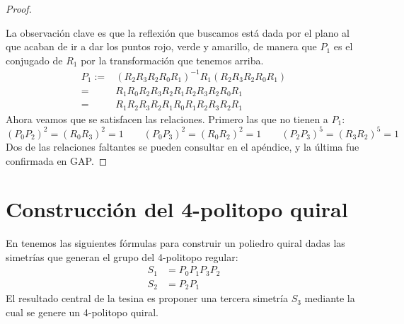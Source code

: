 \documentclass[spanish]{article}
\theoremstyle{definition}
\begin{document}
\begin{proof}
\begin{figure}[H]
\begin{subfigure}{0.4\linewidth}
		\end{subfigure}
	\end{figure}
	La observación clave es que la reflexión que buscamos está dada por el plano al que acaban de ir a dar los puntos rojo, verde y amarillo, de manera que $P_1$ es el conjugado de $R_1$ por la transformación que tenemos arriba.
	\begin{align*}
		P_1:=&(R_2R_3R_2R_0R_1)^{-1}R_1(R_2R_3R_2R_0R_1)\\
		=&R_1R_0R_2R_3R_2R_1R_2R_3R_2R_0R_1\\
		=&R_1R_2R_3R_2R_1R_0R_1R_2R_3R_2R_1
	\end{align*}
	Ahora veamos que se satisfacen las relaciones. Primero las que no tienen a $P_1$:
	\[(P_0P_2)^2=(R_0R_3)^2=1\qquad (P_0P_3)^2=(R_0R_2)^2=1\qquad (P_2P_3)^5=(R_3R_2)^5=1\]
	Dos de las relaciones faltantes se pueden consultar en el apéndice, y la última fue confirmada en GAP.
\end{proof}

\section{Construcción del 4-politopo quiral}
En \cite{bracho2021chiral} tenemos las siguientes fórmulas para construir un poliedro quiral dadas las simetrías que generan el grupo del 4-politopo regular:
\begin{align*}
	S_1&=P_0P_1P_3P_2\\
	S_2&=P_2P_1
\end{align*}
El resultado central de la tesina es proponer una tercera simetría $S_3$ mediante la cual se genere un 4-politopo quiral.
\end{document}
